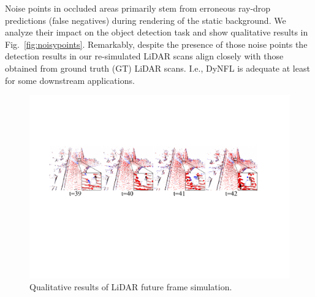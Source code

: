 \documentclass[10pt,twocolumn,letterpaper]{article}
\begin{document}
Noise points in occluded areas primarily stem from erroneous ray-drop predictions (false negatives) during rendering of the static background. We analyze their impact on the object detection task and show qualitative results in Fig.~\ref{fig:noisypoints}. Remarkably, despite the presence of those noise points the detection results in our re-simulated LiDAR scans align closely with those obtained from ground truth (GT) LiDAR scans. I.e., DyNFL is adequate at least for some downstream applications.


\begin{figure}[t]
    \centering
        \includegraphics[width=1\linewidth]{Figures_rebuttal/future_frames.pdf}
        
        \caption{Qualitative results of LiDAR future frame simulation.
        }
    \label{fig:future_frames}
    
\end{figure}
\end{document}
